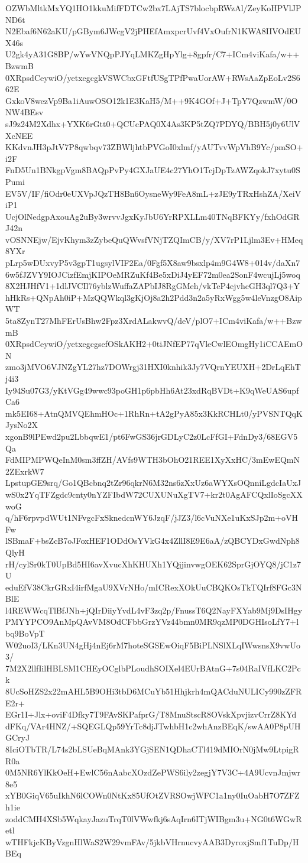 OZWbMltkMxYQ1HO1kkuMifFDTCw2bx7LAjTS7blocbpRWzAl/ZeyKoHPVlJPND6t
N2Ebaf6N62aKU/pGBym6JWcgV2jPHEfAmxpcrUvf4VxOufrN1KWA8IIVOdEUX46s
U2gk4yA31G8BP/wYwVNQpPJYqLMKZgHpYlg+8gpfr/C7+ICm4viKafa/w++BzwmB
0XRpsdCeywiO/yetxegcgkVSWCbxGFtfUSgTPfPwaUorAW+RWsAaZpEoLv2S662E
GxkoV8wezVp9Ba1iAuwOSO12k1E3KaH5/M++9K4GOf+J+TpY7QzwmW/0ONW4BEsv
sJ9z24M2Xdhx+YXK6rGtt0+QCUcPAQ0X4As3KP5tZQ7PDYQ/BBH5j0y6UlVXcNEE
KKdvnJH3pJtV7P8qwbqv73ZBWljhtbPVGoI0xlmf/yAUTvvWpVhB9Yc/pmSO+i2F
FnD5Un1BNkgpVgm8BAQpPvPy4GXJaUE4c27YhO1TcjDpTzAWZqokJ7xytu0SPumi
EV5V/IF/fiOdr0eUXVpJQzTH8Bn6OysneWy9FeA8mL+zJE9yTRxHshZA/XeiViP1
UcjOlNedgpAxouAg2uBy3wrvvJgxKyJbU6YrRPXLLm40TNqBFKYy/fxhOdGRJ42n
vOSNNEjw/EjvKhym3zZybeQuQWvsfVNjTZQImCB/y/XV7rP1Ljlm3Ev+HMeq8YXr
pLrp5wDUxvyP5v3gpT1ugsylVIF2Ea/0Fgf5X8aw9bsxlp4m9G4W8+014v/daXn7
6w5fJZVY9IOJCizfEmjKIPOeMRZuKf4Be5xDiJ4yEF72m0ea2SonF4wcujLj5woq
8X2HJHfV1+1dlJVCIl76yblzWuffaZAPbIJ8RgGMeh/vkTeP4ejvhcGH3ql7Q3+Y
hHkRs+QNpAh0iP+MzQQWkql3gKjOj8a2h2Pdd3n2a5yRxWgg5w4leVnzgO8AipWT
5ta8ZynT27MhFErUsBhw2Fpz3XrdALakwvQ/deV/plO7+ICm4viKafa/w++BzwmB
0XRpsdCeywiO/yetxegcgsefOSkAKH2+0tiJNfEP77qVleCwlEOmgHy1iCCAEmON
zmo3jMVO6VJNZgYL27hz7DOWrgj31HXI0knhik3Jy7VQrnYEUXH+2DrLqEhTj4i3
Iy94Su07G3/yKtVGg49wwc93poGH1p6pbHh6At23xdRqBVDt+K9qWeUAS6upfCa6
mk5EI68+AtnQMVQEhmHOc+1RhRn+tA2gPyA85x3KkRCHLt0/yPVSNTQqKJysNo2X
xgonB9lPEwd2pu2LbbqwE1/pt6FwGS36jrGDLyC2z0LcFfGI+FdnDy3/68EGV5Qa
FdMIPMPWQeInM0sm3ffZH/AVfs9WTH3bOhO21REE1XyXxHC/3mEwEQmN2ZExrkW7
LpstupGE9srq/Go1QBcbnq2tZr96qkrN6M32ns6zXxUz6aWYXsOQnniLgdcIaUxJ
wS0x2YqTFZgdc9cnty0nYZFIbdW72CUXUNuXgTV7+kr2t0AgAFCQxlIoSgcXXwoG
q/hF6rpvpdWUt1NFvgcFxSknedcnWY6JzqF/jJZ3/l6cVuNXe1uKxSJp2m+oVHFw
lSBmaF+bsZcB7oJFoxHEF1ODdOsYVkG4x4ZllI8E9E6aA/zQBCYDxGwdNph8QlyH
rH/cylSr0kT0UpBd5HI6avXvucXhKHUXh1YQjjinvwgOEK62SprGjOYQ8/jC1z7U
eduEfV38CkrGRxI4irfMgaU9XVrNHo/mICRexXOkUuCBQKOsTkTQIrf8FGc3NBlE
l4REWWcqTlBfJNh+jQIrDiiyYvdL4vF3zq2p/FnussT6Q2NayFXYab9Mj9DsIHgy
PMYYPCO9AnMpQAvVM8OdCFbbGrzYVz44bmn0MR9qzMP0DGHIsoLfY7+lbq9BoVpT
W02uoI3/LKn3UN4gHj4nEj6rM7hoteSGSEwOiqF5BiPLNSlXLqIWwsnsX9vwUo3/
7M2X2llfIilHBLSM1CHEyOCglbPLoudhSOIXel4EUrBAtnG+7s04RaIVfLKC2Pck
8UcSoHZS2x22mAHL5B9OHi3tbD6MCuYb51Hhjkrh4mQACduNULICy990zZFRE2r+
EGr1I+Jlx+oviF4Dfky7T9FAvSKPafprG/T8MnuStscR8OVskXpvjizvCrrZ8KYd
dFKq/VAr4HNZ/+SQEGLQp59YrTc8djJTwhbH1c2whAnzBEqK/swAA0P8pUHGCryJ
8IciOTbTR/L74s2bLSUeBqMAnk3YGjSEN1QDhaCTl419dMIOrN0jMw9LtpigRR0a
0M5NR6YlKkOeH+EwlC56nAabcXOzdZePWS6ily2zegjY7V3C+4A9UcvnJmjwr8e5
xYB0GiqV65uIkhN6lCOWn0NtKx85UfOtZVRSOwjWFC1a1ny0IuOabH7O7ZFZh1ie
zoddCMH4XSb5WqkayJazuTrqT0lVWwfkj6sAqIrn6ITjWIBgm3u+NG0t6WGwRetl
wTHFkjcKByVzgnHlWaS2W29vmFAv/5jkbVHrnucvyAAB3DyroxjSmf1TuDp/HBEq
